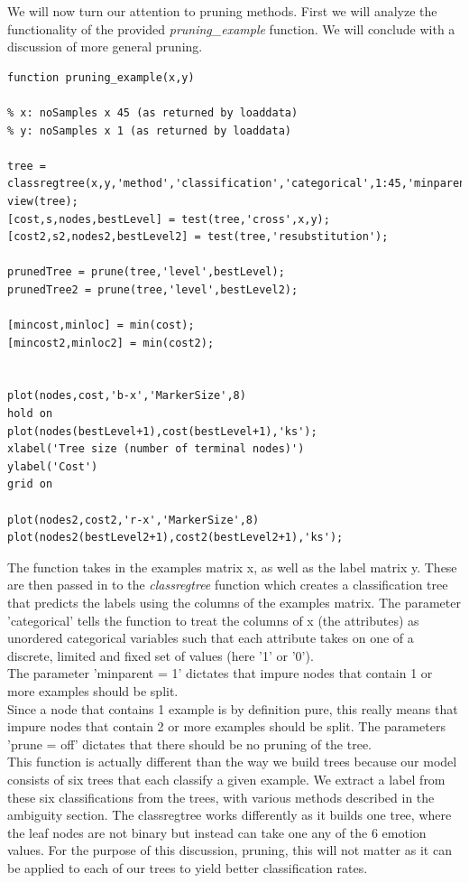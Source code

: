 We will now turn our attention to pruning methods. First we will analyze the functionality of the provided \emph{pruning\_example} function.
We will conclude with a discussion of more general pruning.



\lstset{language=matlab}

\begin{lstlisting}
function pruning_example(x,y)
    
% x: noSamples x 45 (as returned by loaddata)
% y: noSamples x 1 (as returned by loaddata)

tree = classregtree(x,y,'method','classification','categorical',1:45,'minparent',1,'prune','off');
view(tree);
[cost,s,nodes,bestLevel] = test(tree,'cross',x,y);
[cost2,s2,nodes2,bestLevel2] = test(tree,'resubstitution');

prunedTree = prune(tree,'level',bestLevel);
prunedTree2 = prune(tree,'level',bestLevel2);

[mincost,minloc] = min(cost);
[mincost2,minloc2] = min(cost2);


plot(nodes,cost,'b-x','MarkerSize',8)
hold on
plot(nodes(bestLevel+1),cost(bestLevel+1),'ks');
xlabel('Tree size (number of terminal nodes)')
ylabel('Cost')
grid on

plot(nodes2,cost2,'r-x','MarkerSize',8)
plot(nodes2(bestLevel2+1),cost2(bestLevel2+1),'ks');
\end{lstlisting}

The function takes in the examples matrix x, as well as the label matrix y.
These are then passed in to the \emph{classregtree} function
which creates a classification tree that predicts the labels using the columns of the examples matrix.
The parameter 'categorical' tells the function to treat the columns of x (the attributes) as unordered categorical variables
such that each attribute takes on one of a discrete, limited and fixed set of values (here '1' or '0').\\
The parameter 'minparent = 1' dictates that impure nodes that contain 1 or more examples should be split.\\
Since a node that contains 1 example is by definition pure,
this really means that impure nodes that contain 2 or more examples should be split.
The parameters 'prune = off' dictates that there should be no pruning of the tree.\\

This function is actually different than the way we build trees because our model consists of six trees that each classify a given
example.
We extract a label from these six classifications from the trees, with various methods described in the ambiguity section.
The classregtree works differently as it builds one tree, where the leaf nodes are not binary but instead can take one any of the 6 emotion values. For the purpose of this discussion, pruning, this will not matter as it can be applied to each of our trees to yield better classification rates.



